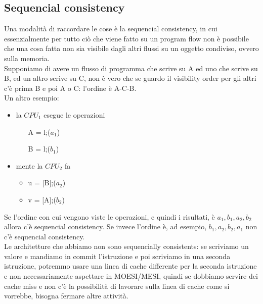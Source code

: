 \documentclass[14pt, oneside]{book}
\begin{document}
\subsection{Sequencial consistency}
Una modalità di raccordare le cose è la sequencial consistency, in cui essenzialmente per tutto ciò che viene fatto su un program flow non è possibile che una cosa fatta non sia visibile dagli altri flussi su un oggetto condiviso, ovvero sulla memoria.\\ Supponiamo di avere un flusso di programma che scrive su A ed uno che scrive su B, ed un altro scrive su C, non è vero che se guardo il visibility order per gli altri c'è prima B e poi A o C: l'ordine è A-C-B.\\ Un altro esempio:
\begin{itemize}
\item la $CPU_1$ esegue le operazioni
\begin{itemize}
\item [A] = l;($a_1$)
\item [B] = l;($b_1$)
\end{itemize}
\item mente la $CPU_2$ fa
\begin{itemize}
\item u = [B];($a_2$)
\item v = [A];($b_2$)
\end{itemize}
\end{itemize} 
Se l'ordine con cui vengono viste le operazioni, e quindi i risultati, è $a_1, b_1, a_2, b_2$ allora c'è sequencial consistency. Se invece l'ordine è, ad esempio, $b_1, a_2, b_2, a_1$ non c'è sequencial consistency.\\
Le architetture che abbiamo non sono sequencially consistents: se scriviamo un valore e mandiamo in commit l'istruzione e poi scriviamo in una seconda istruzione, potremmo usare una linea di cache differente per la seconda istruzione e non necessariamente aspettare in MOESI/MESI, quindi se dobbiamo servire dei cache miss e non c'è la possibilità di lavorare sulla linea di cache come si vorrebbe, bisogna fermare altre attività.
\end{document}
